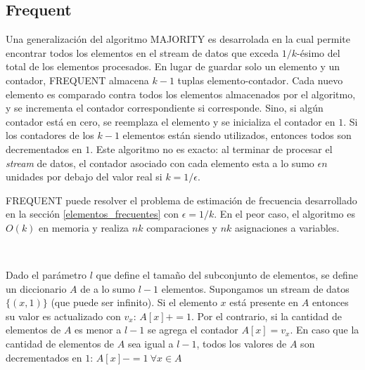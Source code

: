 \documentclass[a4paper,10pt, oneside]{article}
\begin{document}
\subsection*{Frequent}

Una generalización del algoritmo MAJORITY es desarrolada en \cite{Karp:2003:SAF:762471.762473} la cual permite encontrar todos los elementos en el stream de datos que exceda $1/k$-ésimo del total de los elementos procesados. En lugar de guardar solo un elemento y un contador, FREQUENT almacena $k-1$ tuplas elemento-contador. Cada nuevo elemento es comparado contra todos los elementos almacenados por el algoritmo, y se incrementa el contador correspondiente si corresponde. Sino, si algún contador está en cero, se reemplaza el elemento y se inicializa el contador en $1$. Si los contadores de los $k-1$ elementos están siendo utilizados, entonces todos son decrementados en $1$. Este algoritmo no es exacto: al terminar de procesar el \textit{stream} de datos, el contador asociado con cada elemento esta a lo sumo $\epsilon n$ unidades por debajo del valor real si $k = 1/ \epsilon$.\cite{Kranakis03boundsfor}

FREQUENT puede resolver el problema de estimación de frecuencia desarrollado en la sección \ref{elementos_frecuentes} con $\epsilon = 1/k$. En el peor caso, el algoritmo es $O(k)$ en memoria y realiza $nk$ comparaciones y $nk$ asignaciones a variables.



\



 Dado el parámetro $l$ que define el tamaño del subconjunto de elementos, se define un diccionario $A$ de a lo sumo $l-1$ elementos. Supongamos un stream de datos $\{(x,1)\}$ (que puede ser infinito). Si el elemento $x$ está presente en $A$ entonces su valor es actualizado con $v_x$: $A[x]+=1$. Por el contrario, si la cantidad de elementos de $A$ es menor a $l-1$ se agrega el contador $A[x]=v_x$. En caso que la cantidad de elementos de $A$ sea igual a $l-1$, todos los valores de $A$ son decrementados en $1$: $A[x]-=1 \ \forall x \in A$
\newpage
\nocite{*}
\printbibliography
\end{document}
